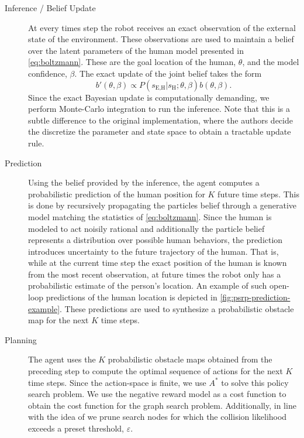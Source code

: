 \begin{description}
  \item[Inference / Belief Update] At every times step the robot receives an
    exact observation of the external state of the environment. These
    observations are used to maintain a belief over the latent parameters of
    the human model presented in \cref{eq:boltzmann}. These are the goal
    location of the human, $\theta$, and the model confidence, $\beta$. The
    exact update of the joint belief takes the form \begin{equation} b'(\theta,
    \beta) \propto P(s_\text{E,H} | s_\text{H}; \theta, \beta) b(\theta,
    \beta). \end{equation} Since the exact Bayesian update is computationally
    demanding, we perform Monte-Carlo integration to run the inference. Note
    that this is a subtle difference to the original implementation, where the
    authors decide the discretize the parameter and state space to obtain
    a tractable update rule.
  \item[Prediction] Using the belief provided by the inference, the agent
    computes a probabilistic prediction of the human position for $K$ future
    time steps. This is done by recursively propagating the particles belief
    through a generative model matching the statistics of \cref{eq:boltzmann}.
    Since the human is modeled to act noisily rational and additionally the
    particle belief represents a distribution over possible human behaviors,
		the prediction introduces uncertainty to the future trajectory of the
		human. That is, while at the current time step the exact position of the
 		human is known from the most recent observation, at future times the
	  robot only has a probabilistic estimate of the person's location.
    An example of such open-loop predictions of the human location is depicted
    in \cref{fig:psrp-prediction-example}. These predictions are used to
    synthesize a probabilistic obstacle map for the next $K$ time steps.
  \item[Planning] The agent uses the $K$ probabilistic obstacle maps obtained
    from the preceding step to compute the optimal sequence of actions for the
    next $K$ time steps. Since the action-space is finite, we use $A^\ast$ to
    solve this policy search problem. We use the negative reward model as
    a cost function to obtain the cost function for the graph search problem.
    Additionally, in line with the idea of \cite{fisac2018probabilistically} we
    prune search nodes for which the collision likelihood exceeds a preset
    threshold, $\varepsilon$.
\end{description}

